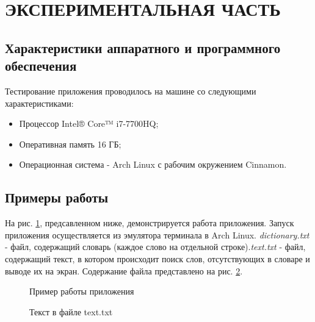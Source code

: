 \documentclass[a4paper,12pt]{article}
\begin{document}
\newpage
\section{ЭКСПЕРИМЕНТАЛЬНАЯ ЧАСТЬ}
\subsection{Характеристики аппаратного и программного обеспечения}
Тестирование приложения проводилось на машине со следующими характеристиками:\\
\begin{itemize}
\item Процессор Intel® Core™ i7-7700HQ;
\item Оперативная память 16 ГБ;
\item Операционная система - Arch Linux с рабочим окружением Cinnamon.
\end{itemize}

\newpage
\subsection{Примеры работы}
На рис. \ref{images:example}, предсавленном ниже, демонстрируется работа приложения. Запуск приложения осуществляется из эмулятора терминала в Arch Linux.
\textit{dictionary.txt} - файл, содержащий словарь (каждое слово на отдельной строке).\textit{text.txt} - файл, содержащий текст, в котором происходит поиск слов, отсутствующих в словаре и выводе их на экран. Содержание файла представлено на рис. \ref{images:example1}.
\begin{figure}[h]
\caption{Пример работы приложения}
\label{images:example}
\end{figure}
\begin{figure}[h]
\caption{Текст в файле text.txt}
\label{images:example1}
\end{figure}
\end{document}
